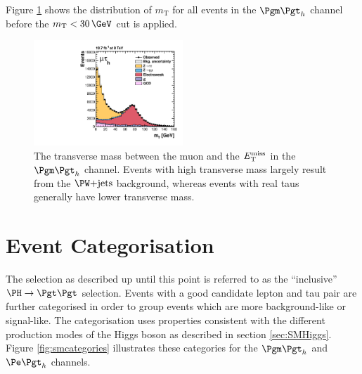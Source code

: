 Figure \ref{fig:transversemass} shows the distribution of $m_{\text{T}}$ for all
events in the $\mutau$ channel before the $m_{\text{T}}<30\,\GeV$ cut is
applied.

\begin{figure}[htb]
\begin{center}
    \includegraphics[width=0.5\textwidth]
      {plots/htt-sm/mt_1_inclusive_mt_2012.pdf}

\end{center}
\caption[The transverse mass between the muon and the $\MET$ in the $\mutau$ channel.]{
 The transverse mass between the muon and the $\MET$ in the $\mutau$ channel.
 Events with high transverse mass largely result from the $\WJets$ background,
 whereas events with real taus generally have lower transverse mass.
}
\label{fig:transversemass}
\end{figure}


\section{Event Categorisation}
\label{sec:eventcategorisation}

The selection as described up until this point is referred to as the
``inclusive'' $\HToTauTau$ selection. 
Events with a good candidate lepton and tau pair are further categorised in
order to group events which are more background-like or signal-like. The
categorisation uses properties consistent with the different production modes of
the Higgs boson as described in section \ref{sec:SMHiggs}. Figure
\ref{fig:smcategories} illustrates these categories for the $\mutau$ and $\etau$
channels.

